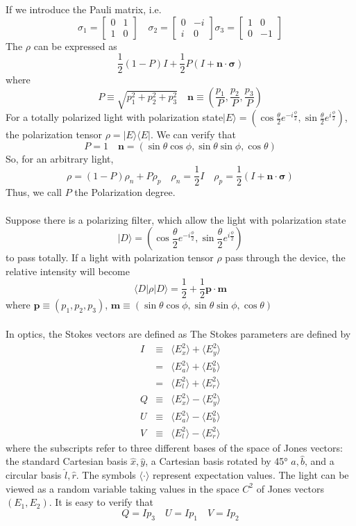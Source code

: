 If we introduce the Pauli matrix, i.e.
\[\sigma_1 = \left[ \begin{matrix} 0& 1\\ 1& 0\end{matrix} \right] \quad \sigma_2 = \left[ \begin{matrix} 0& - i\\ i& 0\end{matrix} \right] \sigma_3 = \left[ \begin{matrix} 1& 0\\ 0& -1\end{matrix} \right] \]
The $\rho$ can be expressed as
\[\frac{1}{2} (1-P) I + \frac{1}{2} P(I + \bm{n} \cdot \bm{\sigma})\]
where
\[P \equiv \sqrt{p_1^2 + p_2^2 + p_3^2} \quad \bm{n} \equiv (\frac{p_1}{P},\frac{p_2}{P},\frac{p_3}{P})\]
For a totally polarized light with polarization state$ | E\rangle = (\cos \frac{\theta}{2} e^{-i\frac{\phi}{2}} , \sin \frac{\theta}{2} e^{i\frac{\phi}{2}})$, the polarization tensor $\rho = |E\rangle \langle E|$. We can verify that
\[P = 1 \quad \bm{n} = (\sin\theta \cos\phi, \sin\theta \sin\phi, \cos \theta)\]
So, for an arbitrary light,
\[\rho = (1-P)\rho_{n} + P \rho_{p} \quad \rho_n = \frac{1}{2}I \quad \rho_p = \frac{1}{2}(I + \bm{n} \cdot \bm{\sigma})\]
Thus, we call $P$ the Polarization degree. \\ \\
Suppose there is a polarizing filter,  which allow the light with polarization state
\[| D \rangle = (\cos \frac{\theta}{2} e^{-i\frac{\phi}{2}} , \sin \frac{\theta}{2} e^{i\frac{\phi}{2}})\]
to pass totally. If a light with polarization tensor $\rho$ pass through the device, the relative intensity will become
\[\langle D | \rho | D \rangle = \frac{1}{2} + \frac{1}{2} \bm{p} \cdot \bm{m}\]
where $\bm{p} \equiv (p_1,p_2,p_3)$, $\bm{m} \equiv (\sin\theta \cos\phi, \sin\theta \sin\phi, \cos \theta)$\\ \\
In optics, the Stokes vectors are defined as
The Stokes parameters are defined by
\begin{eqnarray}
I&\equiv& \langle E_{x}^{2}\rangle +\langle E_{y}^{2}\rangle \nonumber \\
&=& \langle E_{a}^{2}\rangle +\langle E_{b}^{2}\rangle \nonumber \\
&=& \langle E_{l}^{2}\rangle +\langle E_{r}^{2}\rangle \nonumber \\
Q&\equiv& \langle E_{x}^{2}\rangle -\langle E_{y}^{2}\rangle \nonumber \\
U&\equiv& \langle E_{a}^{2}\rangle -\langle E_{b}^{2}\rangle \nonumber \\
V&\equiv& \langle E_{l}^{2}\rangle -\langle E_{r}^{2}\rangle \nonumber
\end{eqnarray}
where the subscripts refer to three different bases of the space of Jones vectors: the standard Cartesian basis ${\hat {x}},{\hat {y}}$, a Cartesian basis rotated by 45° ${\hat {a}},{\hat {b}}$, and a circular basis ${\hat {l}},{\hat {r}}$. The symbols $\langle \cdot \rangle$ represent expectation values. The light can be viewed as a random variable taking values in the space $C^2$ of Jones vectors $(E_1,E_2)$. It is easy to verify that
\[Q = Ip_3 \quad U = Ip_1 \quad V = Ip_2\]

